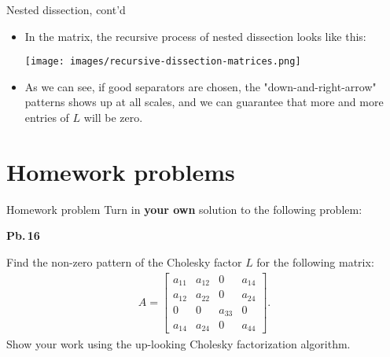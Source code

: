 \documentclass[t,usepdftitle=false]{beamer}
\begin{document}
\begin{frame}{Nested dissection, cont'd}
\begin{itemize}
\item In the matrix, the recursive process of nested dissection looks like this:
\begin{center}
\vspace{.1cm}
\texttt{[image: images/recursive-dissection-matrices.png]}
\end{center}
\item[] As we can see, if good separators are chosen, the "down-and-right-arrow" patterns shows up at all scales, and we can guarantee that more and more entries of $L$ will be zero.
\end{itemize}
\end{frame}

\section{Homework problems}

\begin{frame}{Homework problem}\vspace{.1cm}
Turn in \textbf{your own} solution to the following problem:\vspace{.15cm}\\
\begin{minipage}[t]{0.1\textwidth}
\textbf{Pb.$\,$16}
\end{minipage}
\begin{minipage}[t]{0.89\textwidth}
Find the non-zero pattern of the Cholesky factor $L$ for the following matrix:
\begin{align*}
A=
\begin{bmatrix}
a_{11}&a_{12}&0     &a_{14}\\
a_{12}&a_{22}&0     &a_{24}\\
0     &0     &a_{33}&0     \\
a_{14}&a_{24}&0     &a_{44}    
\end{bmatrix}.
\end{align*}
Show your work using the up-looking Cholesky factorization algorithm.
\end{minipage}\vspace{.15cm}
\end{frame}
\end{document}
